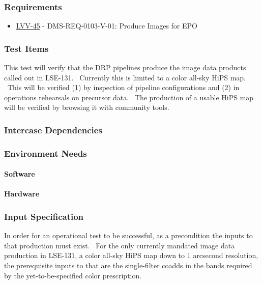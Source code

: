 \subsubsection{Requirements}
\begin{itemize}
\item \href{https://jira.lsstcorp.org/browse/LVV-45}{LVV-45} - DMS-REQ-0103-V-01: Produce Images for EPO
\end{itemize}

\subsubsection{Test Items}
This test will verify that the DRP pipelines produce the image data
products called out in LSE-131. ~Currently this is limited to a color
all-sky HiPS map. ~This will be verified (1) by inspection of pipeline
configurations and (2) in operations rehearsals on precursor data. ~The
production of a usable HiPS map will be verified by browsing it with
community tools.



\subsubsection{Intercase Dependencies}

\subsubsection{Environment Needs}

\paragraph{Software}

\paragraph{Hardware}

\subsubsection{Input Specification}
In order for an operational test to be successful, as a precondition the
inputs to that production must exist. ~For the only currently mandated
image data production in LSE-131, a color all-sky HiPS map down to 1
arcsecond resolution, the prerequisite inputs to that are the
single-filter coadds in the bands required by the yet-to-be-specified
color prescription.



